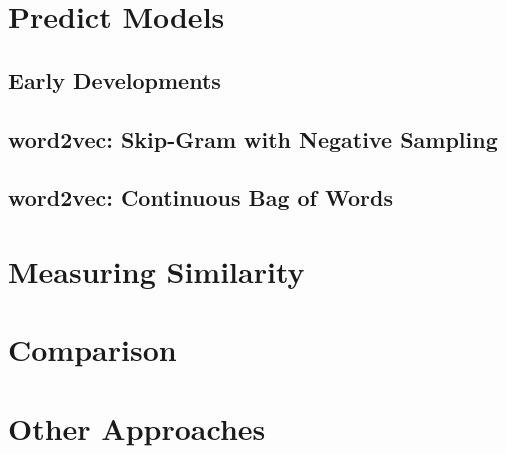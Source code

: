 \section{Predict Models}

\subsection{Early Developments}

\subsection{word2vec: Skip-Gram with Negative Sampling}

\subsection{word2vec: Continuous Bag of Words}

\section{Measuring Similarity}

\section{Comparison}

\section{Other Approaches}
